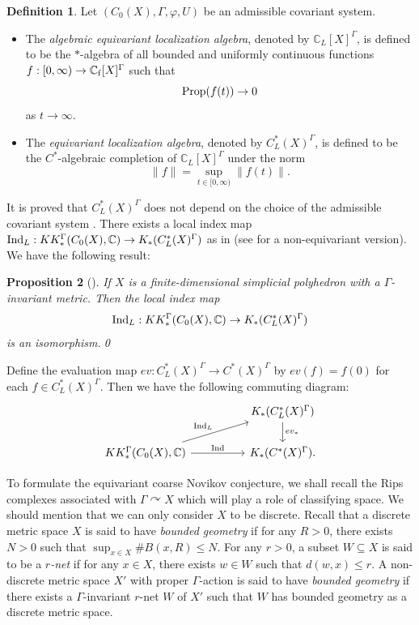 \documentclass[11pt]{article}
\theoremstyle{definition}
\newtheorem{Def}{Definition}[section]
\theoremstyle{plain}
\newtheorem{Pro}[Def]{Proposition}
\def\ind{\textup{Ind}}
\def\prop{\textup{Prop}}
\def\Ga{\Gamma}
\def\car{\curvearrowright}
\begin{document}
\begin{Def}\label{equivariant localization algebra}
Let $(C_0(X), \Gamma, \varphi, U)$ be an admissible covariant system.\begin{itemize}
\item[(1)]The {\em algebraic equivariant localization algebra},
denoted by $\mathbb{C}_L[X]^{\Ga} $, is defined to be the $*$-algebra of all bounded and uniformly continuous functions $f:[0,\infty)\to\IC_{\rm f}[X]^{\Ga}$ such that
$$\prop(f(t))\to0$$
as $t\to\infty$.
\item[(2)]The {\em equivariant localization algebra}, denoted by $C^*_L(X)^{\Ga}$, is defined to be the $C^*$-algebraic completion of $\mathbb{C}_L[X]^{\Ga}$ under the norm
$$\|f\|=\sup_{t\in[0,\infty)}\|f(t)\|.$$
\end{itemize}\end{Def}

It is proved that $C^*_L(X)^{\Ga}$ does not depend on the choice of the admissible covariant system \cite{KY2012}. There exists a local index map $\ind_L:KK_*^{\Ga}(C_0(X),\IC)\to K_*(C^*_L(X)^{\Ga})$ as in \cite{KY2012} (see \cite{Yu1997} for a non-equivariant version). We have the following result:

\begin{Pro}[\cite{KY2012}]\label{localization}
If $X$ is a finite-dimensional simplicial polyhedron with a $\Ga$-invariant metric. Then the local index map
$$\ind_L:KK_*^{\Ga}(C_0(X),\IC)\to K_*(C^*_L(X)^{\Ga})$$
is an isomorphism.\qed
\end{Pro}

Define the evaluation map $ev:C^*_L(X)^{\Ga}\to C^*(X)^{\Ga}$ by $ev(f)=f(0)$ for each $f\in C^*_L(X)^{\Ga}$. Then we have the following commuting diagram:
\[\begin{tikzcd}
                                                                       && {K_*(C^*_L(X)^{\Gamma})} \arrow[d, "ev_*"] \\
{KK_*^{\Gamma}(C_0(X),\IC)} \arrow[rr, "\text{Ind}"] \arrow[rru, "\text{Ind}_L"] && {K_*(C^*(X)^{\Ga}).}                    
\end{tikzcd}\]

To formulate the equivariant coarse Novikov conjecture, we shall recall the Rips complexes associated with $\Ga\car X$ which will play a role of classifying space. We should mention that we can only consider $X$ to be discrete.  Recall that a discrete metric space $X$ is said to have \emph{bounded geometry} if for any $R>0$, there exists $N>0$ such that $\sup_{x\in X}\#B(x, R)\leq N$. For any $r>0$, a subset $W\subseteq X$ is said to be a \emph{$r$-net} if for any $x\in X$, there exists $w\in W$ such that $d(w,x)\leq r$. A non-discrete metric space $X'$ with proper $\Ga$-action is said to have \emph{bounded geometry} if there exists a $\Ga$-invariant $r$-net $W$ of $X'$ such that $W$ has bounded geometry as a discrete metric space.
\end{document}
